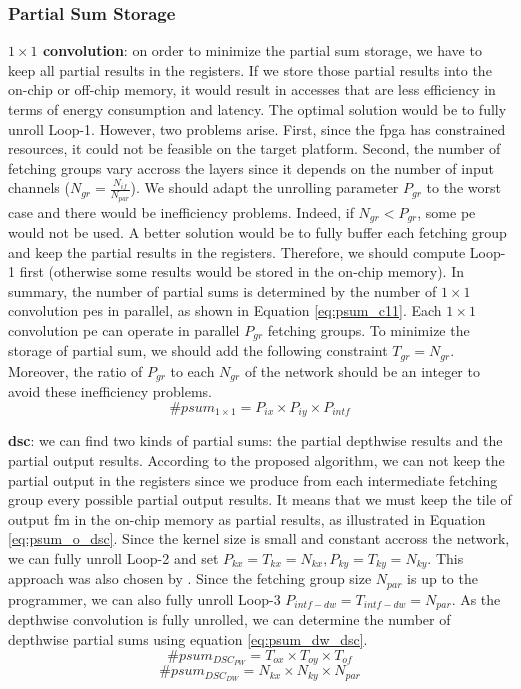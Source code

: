 \subsubsection{Partial Sum Storage}
%
\textbf{$1 \times 1$ convolution}: on order to minimize the partial sum storage, we have to keep all partial results in the registers. If we store those partial results into the on-chip or off-chip memory, it would result in accesses that are less efficiency in terms of energy consumption and latency. The optimal solution would be to fully unroll Loop-1. However, two problems arise. First, since the \acrshort{fpga} has constrained resources, it could not be feasible on the target platform. Second, the number of fetching groups vary accross the layers since it depends on the number of input channels ($N_{gr} = \frac{N_{if}}{N_{par}}$). We should adapt the unrolling parameter $P_{gr}$ to the worst case and there would be inefficiency problems. Indeed, if $N_{gr} < P_{gr}$, some \acrshort{pe} would not be used. A better solution would be to fully buffer each fetching group and keep the partial results in the registers. Therefore, we should compute Loop-1 first (otherwise some results would be stored in the on-chip memory).
In summary, the number of partial sums is determined by the number of $1 \times 1$ convolution \acrshort{pe}s in parallel, as shown in Equation \eqref{eq:psum_c11}. Each $1 \times 1$ convolution \acrshort{pe} can operate in parallel $P_{gr}$ fetching groups. To minimize the storage of partial sum, we should add the following constraint $T_{gr} = N_{gr}$. Moreover, the ratio of $P_{gr}$ to each $N_{gr}$ of the network should be an integer to avoid these inefficiency problems.
%
\begin{equation}
    \# psum_{1 \times 1} = P_{ix} \times P_{iy} \times P_{intf}
    \label{eq:psum_c11}
\end{equation}

\textbf{\acrshort{dsc}}: we can find two kinds of partial sums: the partial depthwise results and the partial output results. According to the proposed algorithm, we can not keep the partial output in the registers since we produce from each intermediate fetching group every possible partial output results. It means that we must keep the tile of output \acrshort{fm} in the on-chip memory as partial results, as illustrated in Equation \eqref{eq:psum_o_dsc}. Since the kernel size is small and constant accross the network, we can fully unroll Loop-2 and set $P_{kx} = T_{kx} = N_{kx}, P_{ky} = T_{ky} = N_{ky}$. This approach was also chosen by \textcite{motamedi_placid_2017}. Since the fetching group size $N_{par}$ is up to the programmer, we can also fully unroll Loop-3 $P_{intf-dw} = T_{intf-dw} = N_{par}$. As the depthwise convolution is fully unrolled, we can determine the number of depthwise partial sums using equation \eqref{eq:psum_dw_dsc}.
%
\begin{equation}
    \# psum_{DSC_{PW}} = T_{ox} \times T_{oy} \times T_{of}
    \label{eq:psum_o_dsc}
\end{equation}
%
\begin{equation}
    \# psum_{DSC_{DW}} = N_{kx} \times N_{ky} \times N_{par}
    \label{eq:psum_dw_dsc}
\end{equation}
%
